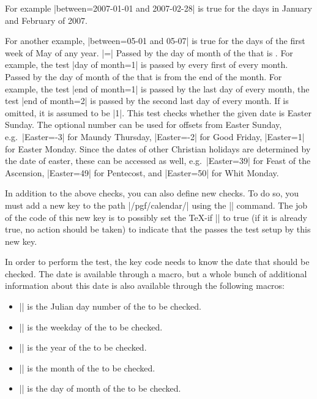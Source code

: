 \begin{command}{\pgfcalendarifdate{}}
\begin{itemize}
            For example |between=2007-01-01 and 2007-02-28| is true for the
            days in January and February of 2007.

            For another example, |between=05-01 and 05-07| is true for the days
            of the first week of May of any year.
        |=| Passed by the day of
            month of the  that is . For example, the
            test |day of month=1| is passed by every first of every month.
         Passed by the
            day of month of the  that is  from the end
            of the month. For example, the test |end of month=1| is passed by
            the last day of every month, the test |end of month=2| is passed by
            the second last day of every month. If  is omitted, it
            is assumed to be |1|.
         This test checks
            whether the given date is Easter Sunday.  The optional number can
            be used for offsets from Easter Sunday, e.g.\ |Easter=-3| for
            Maundy Thursday, |Easter=-2| for Good Friday, |Easter=1| for Easter
            Monday.  Since the dates of other Christian holidays are determined
            by the date of easter, these can be accessed as well, e.g.\
            |Easter=39| for Feast of the Ascension, |Easter=49| for Pentecost,
            and |Easter=50| for Whit Monday.
    \end{itemize}

    In addition to the above checks, you can also define new checks. To do so,
    you must add a new key to the path |/pgf/calendar/| using the |\pgfkeys|
    command. The job of the code of this new key is to possibly set the \TeX-if
    |\ifpgfcalendarmatches| to true (if it is already true, no action should be
    taken) to indicate that the \meta{date} passes the test setup by this new
    key.

    In order to perform the test, the key code needs to know the date that
    should be checked. The date is available through a macro, but a whole bunch
    of additional information about this date is also available through the
    following macros:
    \begin{itemize}
        \item |\pgfcalendarifdatejulian| is the Julian day number of the
            \meta{date} to be checked.
        \item |\pgfcalendarifdateweekday| is the weekday of the  to
            be checked.
        \item |\pgfcalendarifdateyear| is the year of the  to be
            checked.
        \item |\pgfcalendarifdatemonth| is the month of the  to be
            checked.
        \item |\pgfcalendarifdateday| is the day of month of the  to
            be checked.
    \end{itemize}


\end{command}
